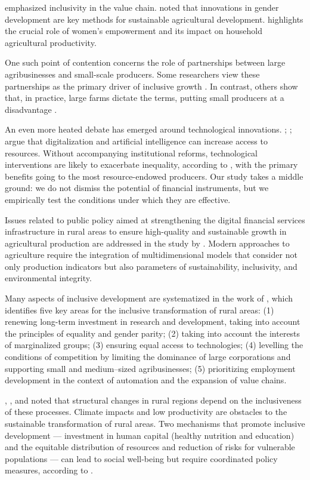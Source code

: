 ﻿\documentclass[pdflatex,sn-mathphys-ay]{sn-jnl}
\begin{document}
\citet{ref81} emphasized inclusivity in the value chain.
\citet{ref24} noted that innovations in gender development are key
methods for sustainable agricultural development. \citet{ref27}
highlights the crucial role of women's empowerment and its impact on
household agricultural productivity.

One such point of contention concerns the role of partnerships between
large agribusinesses and small-scale producers. Some researchers view
these partnerships as the primary driver of inclusive growth
\citep{ref34,ref90}. In contrast, others show that, in practice, large farms dictate the terms, putting
small producers at a disadvantage \citep{ref90}.

An even more heated debate has emerged around technological innovations.
\citet{ref105}; \citet{ref72}; \citep{ref43,ref37,ref104} argue that digitalization and
artificial intelligence can increase access to resources. Without
accompanying institutional reforms, technological interventions are
likely to exacerbate inequality, according to \citet{ref28},
with the primary benefits going to the most resource-endowed producers.
Our study takes a middle ground: we do not dismiss the potential of
financial instruments, but we empirically test the conditions under
which they are effective.

Issues related to public policy aimed at strengthening the digital
financial services infrastructure in rural areas to ensure high-quality
and sustainable growth in agricultural production are addressed in the
study by \citet{ref38}. Modern approaches to agriculture
require the integration of multidimensional models that consider not only
production indicators but also parameters of
sustainability, inclusivity, and environmental integrity.

Many aspects of inclusive development are systematized in the work of
\citet{ref55}, which identifies five key areas for the
inclusive transformation of rural areas: (1) renewing long-term
investment in research and development, taking into account the
principles of equality and gender parity; (2) taking into account the
interests of marginalized groups; (3) ensuring equal access to
technologies; (4) levelling the conditions of competition by limiting the
dominance of large corporations and supporting small and medium--sized
agribusinesses; (5) prioritizing employment development in the context
of automation and the expansion of value chains.

\citet{ref47}, \citet{ref64}, and \citet{ref96} noted that structural changes in rural
regions depend on the inclusiveness of these processes. Climate impacts
and low productivity are obstacles to the sustainable transformation of
rural areas. Two mechanisms that promote inclusive development ---
investment in human capital (healthy nutrition and education) and the
equitable distribution of resources and reduction of risks for
vulnerable populations --- can lead to social well-being but require
coordinated policy measures, according to \citet{ref21}.
\end{document}
